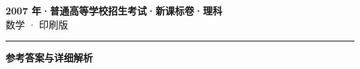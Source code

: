 \documentclass[zihao=5, a4paper]{ctexart}
\begin{document}
\begin{center}
  {\Large\bfseries 2007 年·普通高等学校招生考试·新课标卷·理科}\\[4pt]
  {\large 数学 · 印刷版}
\end{center}
\medskip
{}

\par\bigskip\hrule\bigskip
{}
\begin{center}{\large\bfseries 参考答案与详细解析}\end{center}
\smallskip

\end{document}
